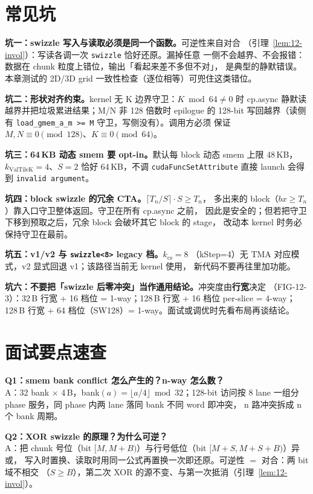 \section{常见坑}

\textbf{坑一：swizzle 写入与读取必须是同一个函数。}可逆性来自对合
（引理~\ref{lem:12-invol}）：写读各调一次 \texttt{swizzle} 恰好还原。漏掉任意
一侧不会越界、不会报错：数据在 chunk 粒度上错位，输出「看起来差不多但不对」，
是典型的静默错误。本章测试的 2D/3D grid 一致性检查（逐位相等）可兜住这类错位。

\textbf{坑二：形状对齐约束。}\allowbreak{}kernel 无 K 边界守卫：$K\bmod 64\neq0$ 时
cp.async 静默读越界并把垃圾累进结果；M/N 非 128 倍数时 epilogue 的 128-bit
写回越界（读侧有 \texttt{load\_\allowbreak{}gmem\_\allowbreak{}a\_\allowbreak{}m >=\allowbreak{} M} 守卫，写侧没有）。调用方必须
保证 $M,N\equiv0\pmod{128}$、$K\equiv0\pmod{64}$。

\textbf{坑三：64\,KB 动态 smem 要 opt-in。}默认每 block 动态 smem 上限 48\,KB，
$k_{\mathrm{ValTileK}}{=}4$、$S{=}2$ 恰好 64\,KB，不调
\texttt{cuda\allowbreak{}Func\allowbreak{}Set\allowbreak{}Attribute} 直接 launch 会得到 \texttt{invalid argument}。

\textbf{坑四：block swizzle 的冗余 CTA。}$\lceil T_n/S\rceil\cdot S\ge T_n$，
多出来的 block（$bx\ge T_n$）靠入口守卫整体返回。守卫在所有 cp.async 之前，
因此是安全的；但若把守卫下移到预取之后，冗余 block 会破坏其它 block 的 stage，
改动本 kernel 时务必保持守卫在最前。

\textbf{坑五：v1/v2 与 \texttt{swizzle<8>} legacy 档。}$k_{\mathrm{cs}}{=}8$
（kStep=4）无 TMA 对应模式，v2 显式回退 v1；该路径当前无 kernel 使用，
新代码不要再往里加功能。

\textbf{坑六：不要把「swizzle 后零冲突」当作通用结论。}冲突度由\textbf{行宽}决定
（FIG-12-3）：32\,B 行宽 + 16 档位 = 1-way；128\,B 行宽 + 16 档位 per-slice =
4-way；128\,B 行宽 + 64 档位（SW128）= 1-way。面试或调优时先看布局再谈结论。

\section{面试要点速查}

\textbf{Q1：smem bank conflict 怎么产生的？n-way 怎么数？}\\
A：32 bank $\times$ 4\,B，bank$(a)=\lfloor a/4\rfloor\bmod32$；128-bit 访问按
8 lane 一组分 phase 服务，同 phase 内两 lane 落同 bank 不同 word 即冲突，
n 路冲突拆成 n 个 bank 周期。

\textbf{Q2：XOR swizzle 的原理？为什么可逆？}\\
A：把 chunk 号位（bit $[M,M{+}B)$）与行号低位（bit $[M{+}S,M{+}S{+}B)$）异或，
写入时置换、读取时用同一公式再置换一次即还原。可逆性 $=$ 对合：两 bit 域不相交
（$S\ge B$），第二次 XOR 的源不变、与第一次抵消（引理~\ref{lem:12-invol}）。

